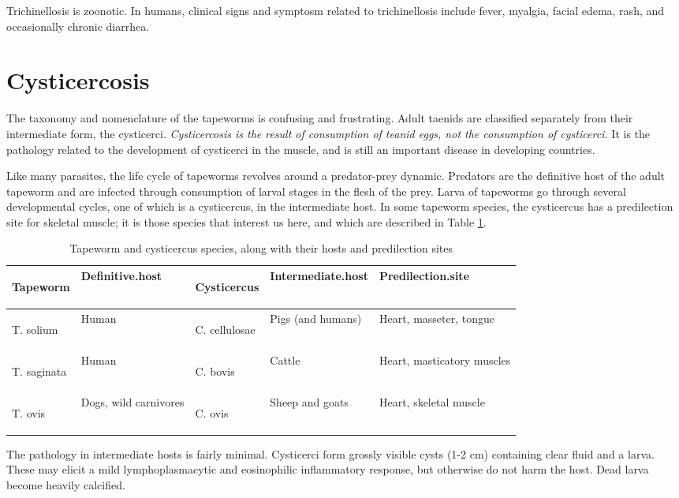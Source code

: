 \documentclass[openany]{report}
\begin{document}
Trichinellosis is zoonotic. In humans, clinical signs and symptosm
related to trichinellosis include fever, myalgia, facial edema, rash,
and occasionally chronic diarrhea.

\section{Cysticercosis}\label{cysticercosis}

The taxonomy and nomenclature of the tapeworms is confusing and
frustrating. Adult taenids are classified separately from their
intermediate form, the cysticerci. \emph{Cysticercosis is the result of
consumption of teanid eggs, not the consumption of cysticerci.} It is
the pathology related to the development of cysticerci in the muscle,
and is still an important disease in developing countries.

Like many parasites, the life cycle of tapeworms revolves around a
predator-prey dynamic. Predators are the definitive host of the adult
tapeworm and are infected through consumption of larval stages in the
flesh of the prey. Larva of tapeworms go through several developmental
cycles, one of which is a cysticercus, in the intermediate host. In some
tapeworm species, the cysticercus has a predilection site for skeletal
muscle; it is those species that interest us here, and which are
described in Table \ref{tab:cysti}.

\begin{table}[t]

\caption{\label{tab:cysti}Tapeworm and cysticercus species, along with their hosts and predilection sites}
\centering
\begin{tabular}{>{\em\raggedright\arraybackslash}p{5em}>{\raggedright\arraybackslash}p{10em}>{\em\raggedright\arraybackslash}p{7em}>{\raggedright\arraybackslash}p{6em}l}
\toprule
Tapeworm & Definitive.host & Cysticercus & Intermediate.host & Predilection.site\\
\midrule
T. solium & Human & C. cellulosae & Pigs (and humans) & Heart, masseter, tongue\\
T. saginata & Human & C. bovis & Cattle & Heart, masticatory muscles\\
T. ovis & Dogs, wild carnivores & C. ovis & Sheep and goats & Heart, skeletal muscle\\
\bottomrule
\end{tabular}
\end{table}

The pathology in intermediate hosts is fairly minimal. Cysticerci form
grossly visible cysts (1-2 cm) containing clear fluid and a larva. These
may elicit a mild lymphoplasmacytic and eosinophilic inflammatory
response, but otherwise do not harm the host. Dead larva become heavily
calcified.
\end{document}
